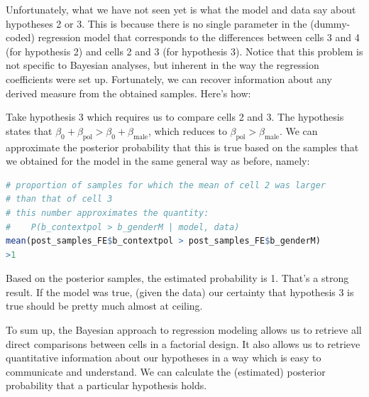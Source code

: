 \documentclass[nobib]{tufte-handout}
\begin{document}
Unfortunately, what we have not seen yet is what the model and data say about hypotheses 2 or 3. This is because there is no single parameter in the (dummy-coded) regression model that corresponds to the differences between cells 3 and 4 (for hypothesis 2) and cells 2 and 3 (for hypothesis 3). Notice that this problem is not specific to Bayesian analyses, but inherent in the way the regression coefficients were set up.
%
%
Fortunately, we can recover information about any derived measure from the obtained samples. Here's how:

Take hypothesis 3 which requires us to compare cells 2 and 3. The hypothesis states that
$\beta_0 + \beta_{\text{pol}} > \beta_0 + \beta_{\text{male}}$, which reduces to
$\beta_{\text{pol}} > \beta_{\text{male}}$. We can approximate the posterior probability that
this is true based on the samples that we obtained for the model in the same general way as
before, namely:

\bigskip

\begin{minipage}[]{1.1\textwidth}
\begin{lstlisting}[language=R]
# proportion of samples for which the mean of cell 2 was larger 
# than that of cell 3 
# this number approximates the quantity:
#    P(b_contextpol > b_genderM | model, data)
mean(post_samples_FE$b_contextpol > post_samples_FE$b_genderM)
>1
\end{lstlisting}
\end{minipage}

Based on the posterior samples, the estimated probability is 1. That's a strong result. If the model was true, (given the data) our certainty that hypothesis 3 is true should be pretty much almost at ceiling.

To sum up, the Bayesian approach to regression modeling allows us to retrieve all direct comparisons between cells in a factorial design. It also allows us to retrieve quantitative information about our hypotheses in a way which is easy to communicate and understand. We can calculate the (estimated) posterior probability that a particular hypothesis holds. 
\end{document}
